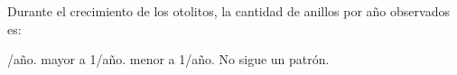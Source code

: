 Durante el crecimiento de los otolitos, la cantidad de anillos por año observados es:

\begin{oneparchoices}
    /a\~no.
    \correctchoice  mayor a 1/a\~no.
    \choice  menor a 1/a\~no.
    \choice  No sigue un patrón.
\end{oneparchoices}
